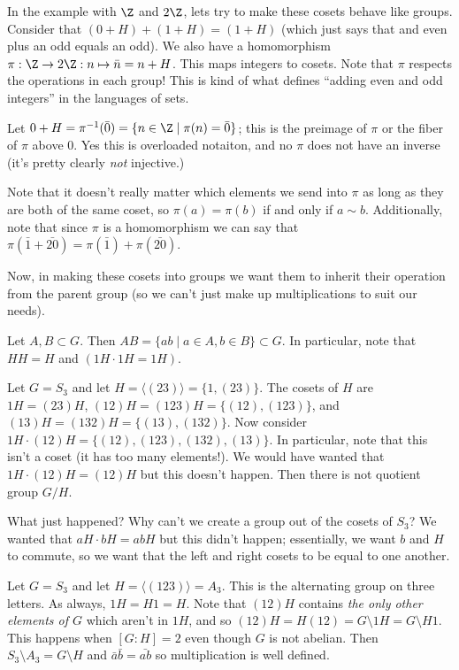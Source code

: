In the example with $\Z$ and $2\Z$, lets try to make these cosets behave like groups. Consider that $(0 + H) + (1 + H) = (1 + H)$ (which just says that and even plus an odd equals an odd). We also have a homomorphism $\pi : \Z \to 2\Z : n \mapsto \bar{n} = n+H$. This maps integers to cosets. Note that $\pi$ respects the operations in each group! This is kind of what defines ``adding even and odd integers'' in the languages of sets.

\begin{notation}
Let $0+H = \pi^{-1}(\bar{0}) = \{n \in \Z \mid \pi(n) = \bar{0}\}$; this is the preimage of $\pi$ or the fiber of $\pi$ above $0$. Yes this is overloaded notaiton, and no $\pi$ does not have an inverse (it's pretty clearly \emph{not} injective.)
\end{notation}

Note that it doesn't really matter which elements we send into $\pi$ as long as they are both of the same coset, so $\pi(a) = \pi(b)$ if and only if $a \sim b$. Additionally, note that since $\pi$ is a homomorphism we can say that $\pi(\bar{1} + \bar{20}) = \pi(\bar{1}) + \pi(\bar{20})$.

Now, in making these cosets into groups we want them to inherit their operation from the parent group (so we can't just make up multiplications to suit our needs).

\begin{definition}
Let $A,B \subset G$. Then $AB = \{ab \mid a \in A, b \in B\} \subset G$. In particular, note that $HH = H$ and $(1H \cdot 1H = 1H)$.
\end{definition}

\begin{example}
Let $G = S_3$ and let $H = \langle (23) \rangle = \{1, (23)\}$. The cosets of $H$ are $1H = (23)H$, $(12)H = (123)H = \{(12), (123)\}$, and $(13)H = (132)H = \{(13), (132)\}$. Now consider $1H \cdot (12)H = \{(12), (123), (132), (13)\}$. In particular, note that this isn't a coset (it has too many elements!). We would have wanted that $1H \cdot (12)H = (12)H$ but this doesn't happen. Then there is not quotient group $G / H$.
\end{example}

What just happened? Why can't we create a group out of the cosets of $S_3$? We wanted that $aH \cdot bH = abH$ but this didn't happen; essentially, we want $b$ and $H$ to commute, so we want that the left and right cosets to be equal to one another.

\begin{example}
Let $G = S_3$ and let $H = \langle (123) \rangle = A_3$. This is the alternating group on three letters. As always, $1H = H1 = H$. Note that $(12)H$ contains \emph{the only other elements of $G$} which aren't in $1H$, and so $(12)H = H(12) = G \setminus 1H = G \setminus H1$. This happens when $[G : H] = 2$ even though $G$ is not abelian. Then $S_3 \setminus A_3 = G \setminus H$ and $\bar{a}\bar{b} = \bar{ab}$ so multiplication is well defined.
\end{example}

